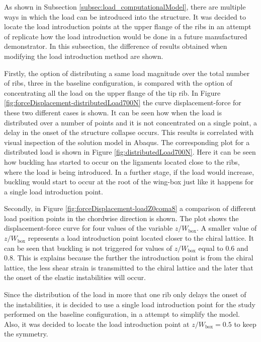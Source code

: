     As shown in Subsection \ref{subsec:load_computationalModel}, there are multiple ways in which the load can be introduced into the structure. It was decided to locate the load introduction points at the upper flange of the ribs in an attempt of replicate how the load introduction would be done in a future manufactured demonstrator. In this subsection, the difference of results obtained when modifying the load introduction method are shown. 

    Firstly, the option of distributing a same load magnitude over the total number of ribs, three in the baseline configuration, is compared with the option of concentrating all the load on the upper flange of the tip rib. In Figure \ref{fig:forceDisplacement-distributedLoad700N} the curve displacement-force for these two different cases is shown. It can be seen how when the load is distributed over a number of points and it is not concentrated on a single point, a delay in the onset of the structure collapse occurs. This results is correlated with visual inspection of the solution model in Abaqus. The corresponding plot for a distributed load is shown in Figure \ref{fig:distributedLoad700N}. Here it can be seen how buckling has started to occur on the ligaments located close to the ribs, where the load is being introduced. In a further stage, if the load would increase, buckling would start to occur at the root of the wing-box just like it happens for a single load introduction point.

    Secondly, in Figure \ref{fig:forceDisplacement-loadZ0coma8} a comparison of different load position points in the chordwise direction is shown. The plot shows the displacement-force curve for four values of the variable $z/W_{\mathrm{box}}$. A smaller value of $z/W_{\mathrm{box}}$ represents a load introduction point located closer to the chiral lattice. It can be seen that buckling is not triggered for values of $z/W_{\mathrm{box}}$ equal to 0.6 and 0.8. This is explains because the further the introduction point is from the chiral lattice, the less shear strain is transmitted to the chiral lattice and the later that the onset of the elastic instabilities will occur. 

    Since the distribution of the load in more that one rib only delays the onset of the instabilities, it is decided to use a single load introduction point for the study performed on the baseline configuration, in a attempt to simplify the model. Also, it was decided to locate the load introduction point at $z/W_{\mathrm{box}} = 0.5$ to keep the symmetry.

